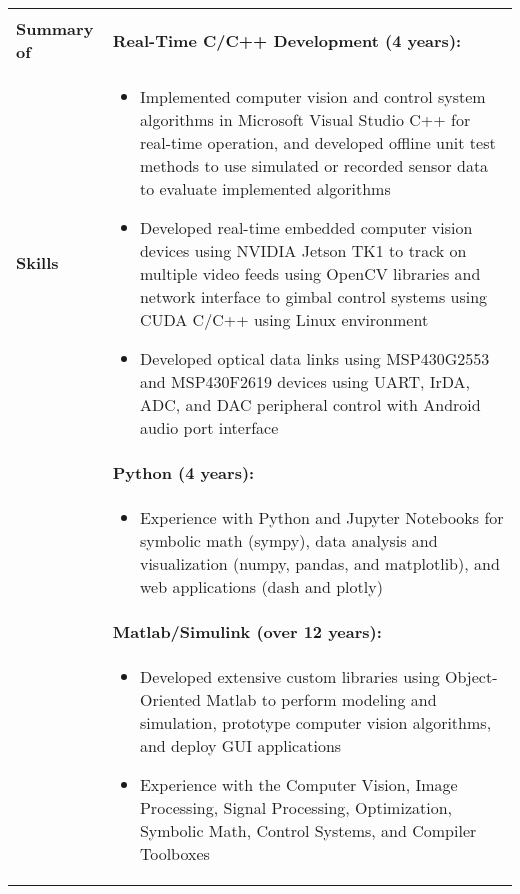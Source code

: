 \begin{tabular}{L{\hlcolw}  L{\rcolw}}
	\hline \hline \\
	\textbf{\Large Summary of } & 
	\textbf{Real-Time C/C++ Development (4 years):}
	\\
	
	\textbf{\Large Skills} & 
	\vspace{-0.25in}
	\begin{itemize}[leftmargin = \itemmargin]
		\item Implemented computer vision and control system algorithms in Microsoft Visual Studio C++ for real-time operation, and developed offline unit test methods to use simulated or recorded sensor data to evaluate implemented algorithms
	
		\item Developed real-time embedded computer vision devices using NVIDIA Jetson TK1 to track on multiple video feeds using OpenCV libraries and network interface to gimbal control systems using CUDA C/C++ using Linux environment
	
		\item Developed optical data links using MSP430G2553 and MSP430F2619 devices using UART, IrDA, ADC, and DAC peripheral control with Android audio port interface
	\end{itemize} \\
	
	& \textbf{Python (4 years):} \\
	&
	\vspace{-0.25in}
	\begin{itemize}[leftmargin = \itemmargin]
		\item Experience with Python and Jupyter Notebooks for symbolic math (sympy), 
		data analysis and visualization (numpy, pandas, and matplotlib), and web applications (dash and plotly)
	\end{itemize}
	\\
	
	& \textbf{Matlab/Simulink (over 12 years):} \\
	& 	
	\vspace{-0.25in}
	\begin{itemize}[leftmargin = \itemmargin]
		
		\item Developed extensive custom libraries using Object-Oriented Matlab to perform modeling and simulation, 
		prototype computer vision algorithms, and deploy GUI applications
		
		\item Experience with the Computer Vision, Image Processing, Signal Processing, Optimization, Symbolic Math, Control Systems, and Compiler Toolboxes
		

\end{itemize}
\end{tabular}
